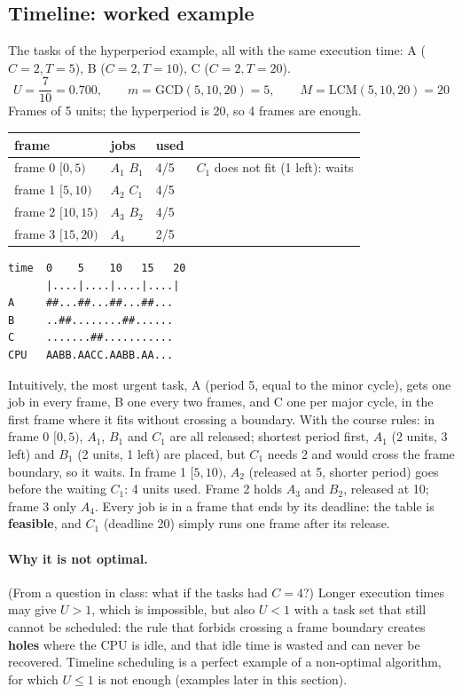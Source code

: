 \subsection{Timeline: worked example}
The tasks of the hyperperiod example, all with the same execution time: A ($C = 2, T = 5$), B ($C = 2, T = 10$), C ($C = 2, T = 20$).
\[
U = \frac{7}{10} = 0.700, \qquad m = \mathrm{GCD}(5, 10, 20) = 5, \qquad M = \mathrm{LCM}(5, 10, 20) = 20
\]
Frames of 5 units; the hyperperiod is 20, so 4 frames are enough.
\begin{center}
\begin{tabular}{l l l l}
\hline
\textbf{frame} & \textbf{jobs} & \textbf{used} & \\
\hline
frame 0 $[0,5)$ & $A_1$ $B_1$ & 4/5 & $C_1$ does not fit (1 left): waits \\
frame 1 $[5,10)$ & $A_2$ $C_1$ & 4/5 & \\
frame 2 $[10,15)$ & $A_3$ $B_2$ & 4/5 & \\
frame 3 $[15,20)$ & $A_4$ & 2/5 & \\
\hline
\end{tabular}
\end{center}
\begin{verbatim}
time  0    5    10   15   20
      |....|....|....|....|
A     ##...##...##...##...
B     ..##........##......
C     .......##...........
CPU   AABB.AACC.AABB.AA...
\end{verbatim}
Intuitively, the most urgent task, A (period 5, equal to the minor cycle), gets one job in every frame, B one every two frames, and C one per major cycle, in the first frame where it fits without crossing a boundary. With the course rules: in frame 0 $[0,5)$, $A_1$, $B_1$ and $C_1$ are all released; shortest period first, $A_1$ (2 units, 3 left) and $B_1$ (2 units, 1 left) are placed, but $C_1$ needs 2 and would cross the frame boundary, so it waits. In frame 1 $[5,10)$, $A_2$ (released at 5, shorter period) goes before the waiting $C_1$: 4 units used. Frame 2 holds $A_3$ and $B_2$, released at 10; frame 3 only $A_4$. Every job is in a frame that ends by its deadline: the table is \textbf{feasible}, and $C_1$ (deadline 20) simply runs one frame after its release.

\paragraph{Why it is not optimal.} (From a question in class: what if the tasks had $C = 4$?) Longer execution times may give $U > 1$, which is impossible, but also $U < 1$ with a task set that still cannot be scheduled: the rule that forbids crossing a frame boundary creates \textbf{holes} where the CPU is idle, and that idle time is wasted and can never be recovered. Timeline scheduling is a perfect example of a non-optimal algorithm, for which $U \le 1$ is not enough (examples later in this section).

